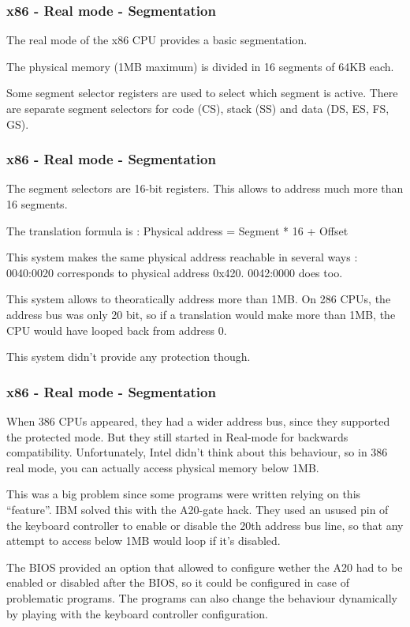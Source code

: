 \begin{frame}
  \frametitle{x86 - Real mode - Segmentation}

  The real mode of the x86 CPU provides a basic segmentation.

  \-

  The physical memory (1MB maximum) is divided in 16 segments of 64KB each.

  \-

  Some segment selector registers are used to select which segment is active. There are separate segment selectors for code (CS), stack (SS) and data (DS, ES, FS, GS).

\end{frame}

\begin{frame}
  \frametitle{x86 - Real mode - Segmentation}

  The segment selectors are 16-bit registers. This allows to address much more than 16 segments.

  \-

  The translation formula is : Physical address = Segment * 16 + Offset

  \-

  This system makes the same physical address reachable in several ways : 0040:0020 corresponds to physical address 0x420. 0042:0000 does too.

  \-

  This system allows to theoratically address more than 1MB. On 286 CPUs, the address bus was only 20 bit, so if a translation would make more than 1MB, the CPU would have looped back from address 0.

  \-

  This system didn't provide any protection though.

\end{frame}

\begin{frame}
  \frametitle{x86 - Real mode - Segmentation}

  When 386 CPUs appeared, they had a wider address bus, since they supported the protected mode. But they still started in Real-mode for backwards compatibility. Unfortunately, Intel didn't think about this behaviour, so in 386 real mode, you can actually access physical memory below 1MB.

  \-

  This was a big problem since some programs were written relying on this ``feature''. IBM solved this with the A20-gate hack. They used an usused pin of the keyboard controller to enable or disable the 20th address bus line, so that any attempt to access below 1MB would loop if it's disabled.

  \-

  The BIOS provided an option that allowed to configure wether the A20 had to be enabled or disabled after the BIOS, so it could be configured in case of problematic programs. The programs can also change the behaviour dynamically by playing with the keyboard controller configuration.

\end{frame}

